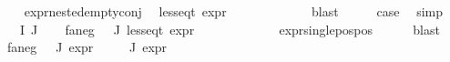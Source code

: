 \begin{isabellebody}
\ \ \isamarkupfalse%
\ expr{\isacharunderscore}{\kern0pt}nested{\isacharunderscore}{\kern0pt}empty{\isacharunderscore}{\kern0pt}conj\ \isamarkupfalse%
\ {\isachardoublequoteopen}less{\isacharunderscore}{\kern0pt}eq{\isacharunderscore}{\kern0pt}t\ {\isacharparenleft}{\kern0pt}expr\ {\isasympsi}{\isacharparenright}{\kern0pt}\ {\isacharparenleft}{\kern0pt}{}{\isacharcomma}{\kern0pt}\ {\isasyminfinity}{\isacharcomma}{\kern0pt}\ {}{\isacharcomma}{\kern0pt}\ {}{\isacharcomma}{\kern0pt}\ {}{\isacharcomma}{\kern0pt}\ {}{\isacharparenright}{\kern0pt}{\isachardoublequoteclose}\isanewline
\ \ \ \ \isamarkupfalse%
\ blast\isanewline
\ \ \isamarkupfalse%
\ \isamarkupfalse%
\ {\isacharquery}{\kern0pt}case\ \isamarkupfalse%
\ simp\isanewline
{}\isamarkupfalse%
\isanewline
\ \ \isamarkupfalse%
\ {\isacharparenleft}{\kern0pt}{}\ {\isasymPhi}\ I\ J{\isacharparenright}{\kern0pt}\isanewline
\ \ \isamarkupfalse%
\ fa{\isacharunderscore}{\kern0pt}neg{\isacharcolon}{\kern0pt}\ {\isachardoublequoteopen}{\isasymforall}{\isasymphi}{\isasymin}{\isasymPhi}\ {\isacharbackquote}{\kern0pt}\ J{\isachardot}{\kern0pt}\ less{\isacharunderscore}{\kern0pt}eq{\isacharunderscore}{\kern0pt}t\ {\isacharparenleft}{\kern0pt}expr\ {\isasymphi}{\isacharparenright}{\kern0pt}\ {\isacharparenleft}{\kern0pt}{}{\isacharcomma}{\kern0pt}\ {\isasyminfinity}{\isacharcomma}{\kern0pt}\ {}{\isacharcomma}{\kern0pt}\ {}{\isacharcomma}{\kern0pt}\ {}{\isacharcomma}{\kern0pt}\ {}{\isacharparenright}{\kern0pt}{\isachardoublequoteclose}\isanewline
\ \ \ \ \isamarkupfalse%
\ expr{\isacharunderscore}{\kern0pt}single{\isacharunderscore}{\kern0pt}pos{\isacharunderscore}{\kern0pt}pos\isanewline
\ \ \ \ \isamarkupfalse%
\ blast\isanewline
\ \ \isamarkupfalse%
\ fa{\isacharunderscore}{\kern0pt}neg{\isacharcolon}{\kern0pt}\ {\isachardoublequoteopen}{\isasymforall}{\isasymphi}{\isasymin}{\isasymPhi}\ {\isacharbackquote}{\kern0pt}\ J{\isachardot}{\kern0pt}\ expr{\isacharunderscore}{\kern0pt}{}\ {\isasymphi}\ {\isasymle}\ {}{\isachardoublequoteclose}\isanewline
{\isachardoublequoteopen}{\isasymforall}{\isasymphi}{\isasymin}{\isasymPhi}\ {\isacharbackquote}{\kern0pt}\ J{\isachardot}{\kern0pt}\ expr{\isacharunderscore}{\kern0pt}{}\ {\isasymphi}\ {\isasymle}\ {}{\isachardoublequoteclose}\isanewline

\end{isabellebody}
